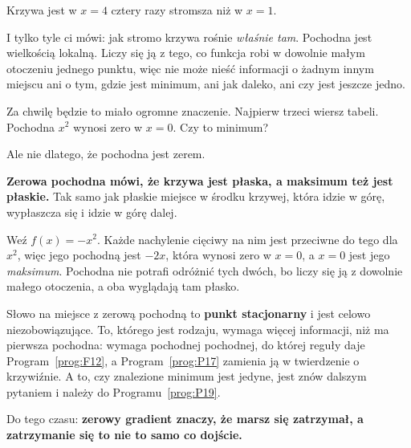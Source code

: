 \begin{fr}
\begin{ansblock}
Krzywa jest w $x = 4$ cztery razy stromsza niż w $x = 1$.
\end{ansblock}

I tylko tyle ci mówi: jak stromo krzywa rośnie \emph{właśnie tam}. Pochodna
jest wielkością lokalną. Liczy się ją z tego, co funkcja robi w dowolnie małym
otoczeniu jednego punktu, więc nie może nieść informacji o żadnym innym
miejscu \dash{} ani o tym, gdzie jest minimum, ani jak daleko, ani czy jest
jeszcze jedno.

Za chwilę będzie to miało ogromne znaczenie. Najpierw trzeci wiersz tabeli.
Pochodna $x^{2}$ wynosi zero w $x = 0$. Czy to minimum?
\dotline
\nextframe
\end{fr}

\begin{fr}
Ale nie dlatego, że pochodna jest zerem.

\begin{trapbox}
\textbf{Zerowa pochodna mówi, że krzywa jest płaska, a maksimum też jest
płaskie.} Tak samo jak płaskie miejsce w środku krzywej, która idzie w górę,
wypłaszcza się i idzie w górę dalej.

Weź $f(x) = -x^{2}$. Każde nachylenie cięciwy na nim jest przeciwne do tego
dla $x^{2}$, więc jego pochodną jest $-2x$, która wynosi zero w $x = 0$, a
$x = 0$ jest jego \emph{maksimum}. Pochodna nie potrafi odróżnić tych dwóch,
bo liczy się ją z dowolnie małego otoczenia, a oba wyglądają tam płasko.

Słowo na miejsce z zerową pochodną to \textbf{punkt stacjonarny} i jest
celowo niezobowiązujące. To, którego jest rodzaju, wymaga więcej informacji,
niż ma pierwsza pochodna: wymaga pochodnej pochodnej, do której reguły daje
Program~\ref{prog:F12}, a Program~\ref{prog:P17} zamienia ją w twierdzenie o
krzywiźnie. A to, czy znalezione minimum jest jedyne, jest znów dalszym
pytaniem i należy do Programu~\ref{prog:P19}.

Do tego czasu: \textbf{zerowy gradient znaczy, że marsz się zatrzymał, a
zatrzymanie się to nie to samo co dojście.}
\end{trapbox}
\end{fr}

